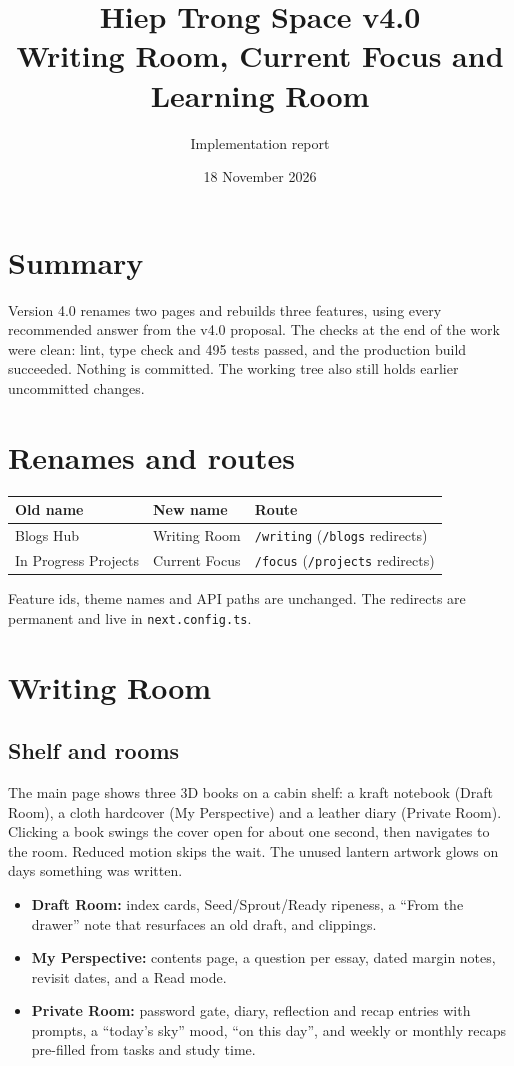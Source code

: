 \documentclass[11pt,a4paper]{article}
\title{Hiep Trong Space v4.0\\[0.3em]\large Writing Room, Current Focus and Learning Room}
\author{Implementation report}
\date{18 November 2026}
\begin{document}
\maketitle

\section{Summary}
Version 4.0 renames two pages and rebuilds three features, using every recommended answer from the v4.0 proposal. The checks at the end of the work were clean: lint, type check and 495 tests passed, and the production build succeeded. Nothing is committed. The working tree also still holds earlier uncommitted changes.

\section{Renames and routes}
\begin{tabular}{@{}lll@{}}
\toprule
Old name & New name & Route \\
\midrule
Blogs Hub & Writing Room & \texttt{/writing} (\texttt{/blogs} redirects) \\
In Progress Projects & Current Focus & \texttt{/focus} (\texttt{/projects} redirects) \\
\bottomrule
\end{tabular}

Feature ids, theme names and API paths are unchanged. The redirects are permanent and live in \texttt{next.config.ts}.

\section{Writing Room}
\subsection{Shelf and rooms}
The main page shows three 3D books on a cabin shelf: a kraft notebook (Draft Room), a cloth hardcover (My Perspective) and a leather diary (Private Room). Clicking a book swings the cover open for about one second, then navigates to the room. Reduced motion skips the wait. The unused lantern artwork glows on days something was written.

\begin{itemize}
\item \textbf{Draft Room:} index cards, Seed/Sprout/Ready ripeness, a ``From the drawer'' note that resurfaces an old draft, and clippings.
\item \textbf{My Perspective:} contents page, a question per essay, dated margin notes, revisit dates, and a Read mode.
\item \textbf{Private Room:} password gate, diary, reflection and recap entries with prompts, a ``today's sky'' mood, ``on this day'', and weekly or monthly recaps pre-filled from tasks and study time.
\end{itemize}
\end{document}
